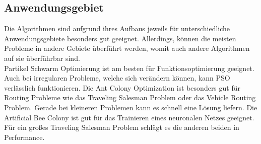 \subsection{Anwendungsgebiet}
Die Algorithmen sind aufgrund ihres Aufbaus jeweils für unterschiedliche Anwendungsgebiete besonders gut geeignet. Allerdings, können die meisten Probleme in andere Gebiete überführt werden, womit auch andere Algorithmen auf sie überführbar sind.\\
Partikel Schwarm Optimierung ist am besten für Funktionsoptimierung geeignet. Auch bei irregularen Probleme, welche sich verändern können, kann PSO verlässlich funktionieren.  
Die Ant Colony Optimization ist besonders gut für Routing Probleme wie das Traveling Salesman Problem \cite{stutzle1997max} oder das Vehicle Routing Problem\cite{gambardella1999macs}. Gerade bei kleineren Problemen kann es schnell eine Lösung liefern\cite{sabet2016comparison}.
Die Artificial Bee Colony ist gut für das Trainieren eines neuronalen Netzes geeignet. Für ein großes Traveling Salesman Problem schlägt es die anderen beiden in Performance\cite{sabet2016comparison}.





